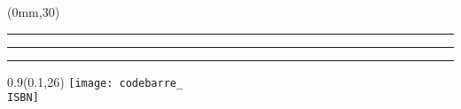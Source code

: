 \begingroup

\textblockorigin{0mm}{0mm}
\setlength{\parindent}{0mm}
\setlength{\banderougewidth}{2\TPHorizModule}
\setlength{\bandeorwidth}{\TPHorizModule}
\setlength{\gapwidth}{2pt}
\addtolength{\bandeorwidth}{-\gapwidth}

\begin{textblock*}{8.5in}(0mm,30\TPVertModule)
  \textcolor{or}{\rule{\bandeorwidth}{\TPVertModule}}%
  \rule{\gapwidth}{0pt}%
  \textcolor{rouge}{\rule{\banderougewidth}{\TPVertModule}} %
\end{textblock*}

\begin{textblock*}{0.9\TPHorizModule}(0.1\TPHorizModule,26\TPVertModule)
  \texttt{[image: codebarre\_\\ISBN]}
\end{textblock*}

\endgroup

